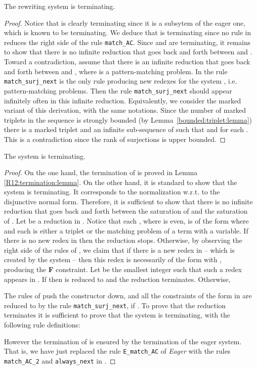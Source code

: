 \documentclass[submission,copyright,creativecommons]{eptcs}
\numberwithin{subcase}{case}
\begin{document}
\begin{lemma}\label{R12:termination:lemma}
The rewriting system  is terminating.
\end{lemma}

\begin{proof}
Notice that  is clearly
terminating since it is a subsytem of the eager one, which is known
to be terminating.  We deduce that  is terminating since no
rule in  reduces the right side of the rule 
\texttt{match\_AC}.
Since  and  are terminating, it remains to show
that there is no infinite  reduction that goes back and forth between
 and . Toward a contradiction, assume that there is
an infinite reduction  that goes back
and forth between  and , where 
 is a pattern-matching problem. In  the rule \texttt{match\_surj\_next}
is the only rule producing new redexes for the system , i.e.
pattern-matching problems. Then the rule \texttt{match\_surj\_next} should
appear infinitely often in this infinite reduction. Equivalently, we consider
the marked variant of this derivation, with the same notations. Since the
number of marked triplets in the sequence  is strongly bounded (by
Lemma~\ref{bounded:triplet:lemma}) there is a marked triplet  and
an infinite sub-sequence  of  such that
 and  for each .
This is a contradiction since the rank of surjections is upper bounded.
\end{proof}

\begin{theorem}
The  system  is terminating.
\label{termination:theorem}
\end{theorem}

\begin{proof}
On the one hand, the termination of   is proved
in Lemma \ref{R12:termination:lemma}. On the other hand, it is standard to show
that  the system   is terminating. It corresponds to the
normalization w.r.t. to the disjunctive normal  form. Therefore, it is sufficient
to  show  that there is no infinite  reduction that goes back and forth between
the saturation of  and the saturation of
. Let  be a reduction in
. Notice that each , where  is even, is of the form 
where  and each  is either a triplet or the
matching problem of a term with a variable. If there is no new redex
in  then the reduction   stops. Otherwise, by observing the right side of the rules of , we claim that if there is a new redex in  -- which is
 created by the system  -- then this redex is  necessarily of the form
 with , producing
 the \textbf{F} constraint. Let  be the smallest integer such that
 such a redex appears in . If  then  is reduced to
  and the reduction 
 terminates. Otherwise, 


The rules of   push the  constructor down, and all
the  constraints of the form   in  are
reduced to  by the rule \texttt{match\_surj\_next}, if
. To prove that the reduction
 terminates it is sufficient to prove that the system
 is
terminating, with the following rule definitions:

However the termination of  is ensured by the termination of  
the eager system. That is, we have just replaced the rule \texttt{E\_match\_AC}
of \textit{Eager} with the rules \texttt{match\_AC\_2} and
\texttt{always\_next} in .
\end{proof}
\end{document}
